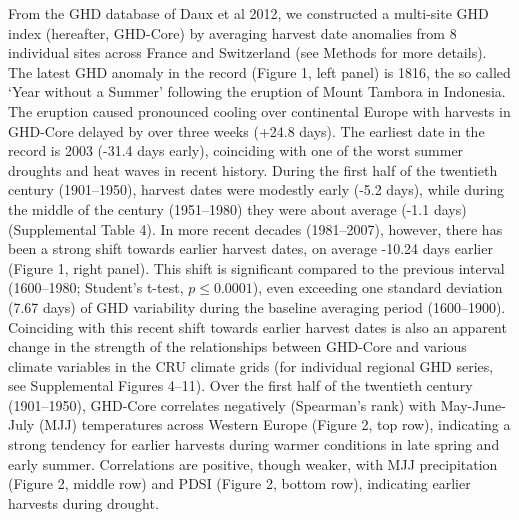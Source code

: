 \documentclass[final]{nature}
\begin{document}
\indent From the GHD database of Daux et al 2012\cite{Daux2012}, we constructed a multi-site GHD index (hereafter, GHD-Core) by averaging harvest date anomalies from 8 individual sites across France and Switzerland (see Methods for more details). The latest GHD anomaly in the record (Figure 1, left panel) is 1816, the so called `Year without a Summer' following the eruption of Mount Tambora in Indonesia\cite{Oppenheimer2003}. The eruption caused pronounced cooling over continental Europe with harvests in GHD-Core delayed by over three weeks (+24.8 days). The earliest date in the record is 2003 (-31.4 days early), coinciding with one of the worst summer droughts and heat waves in recent history\cite{Rebetz2006}. During the first half of the twentieth century (1901--1950), harvest dates were modestly early (-5.2 days), while during the middle of the century (1951--1980) they were about average (-1.1 days) (Supplemental Table 4). In more recent decades (1981--2007), however, there has been a strong shift towards earlier harvest dates, on average -10.24 days earlier (Figure 1, right panel). This shift is significant compared to the previous interval (1600--1980; Student's t-test, $p\le0.0001$), even exceeding one standard deviation (7.67 days) of GHD variability during the baseline averaging period (1600--1900).\\
\indent Coinciding with this recent shift towards earlier harvest dates is also an apparent change in the strength of the relationships between GHD-Core and various climate variables in the CRU climate grids (for individual regional GHD series, see Supplemental Figures 4--11). Over the first half of the twentieth century (1901--1950), GHD-Core correlates negatively (Spearman's rank) with May-June-July (MJJ) temperatures across Western Europe (Figure 2, top row), indicating a strong tendency for earlier harvests during warmer conditions in late spring and early summer. Correlations are positive, though weaker, with MJJ precipitation (Figure 2, middle row) and PDSI (Figure 2, bottom row), indicating earlier harvests during drought.\\
\end{document}
